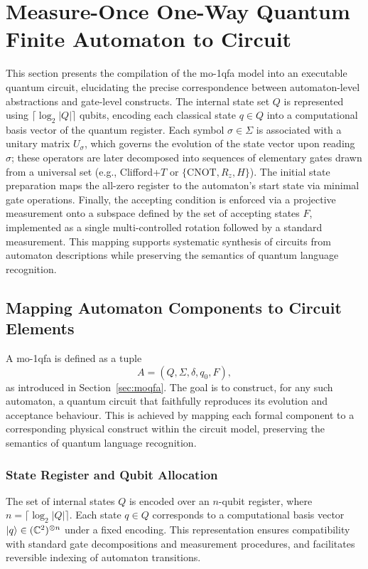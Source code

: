 \section{Measure-Once One-Way Quantum Finite Automaton to Circuit}
\label{sec:moqfa-to-circuit}

This section presents the compilation of the \gls{mo-1qfa} model into an executable quantum circuit, elucidating the precise correspondence between automaton-level abstractions and gate-level constructs. The internal state set $Q$ is represented using $\lceil\log_{2}|Q|\rceil$ qubits, encoding each classical state $q \in Q$ into a computational basis vector of the quantum register. Each symbol $\sigma \in \Sigma$ is associated with a unitary matrix $U_\sigma$, which governs the evolution of the state vector upon reading $\sigma$; these operators are later decomposed into sequences of elementary gates drawn from a universal set (e.g., Clifford+$T$ or $\{\mathrm{CNOT}, R_z, H\}$). The initial state preparation maps the all-zero register to the automaton’s start state via minimal gate operations. Finally, the accepting condition is enforced via a projective measurement onto a subspace defined by the set of accepting states $F$, implemented as a single multi-controlled rotation followed by a standard measurement. This mapping supports systematic synthesis of circuits from automaton descriptions while preserving the semantics of quantum language recognition.

\subsection{Mapping Automaton Components to Circuit Elements}
A \gls{mo-1qfa} is defined as a tuple
\[
  A = (Q,\Sigma,\delta,q_0,F),
\]
as introduced in Section~\ref{sec:moqfa}. The goal is to construct, for any such automaton, a quantum circuit that faithfully reproduces its evolution and acceptance behaviour. This is achieved by mapping each formal component to a corresponding physical construct within the circuit model, preserving the semantics of quantum language recognition.

\subsubsection*{State Register and Qubit Allocation}
The set of internal states $Q$ is encoded over an $n$-qubit register, where $n = \lceil\log_2 |Q|\rceil$. Each state $q \in Q$ corresponds to a computational basis vector $\ket{q} \in (\mathbb{C}^2)^{\otimes n}$ under a fixed encoding. This representation ensures compatibility with standard gate decompositions and measurement procedures, and facilitates reversible indexing of automaton transitions.


